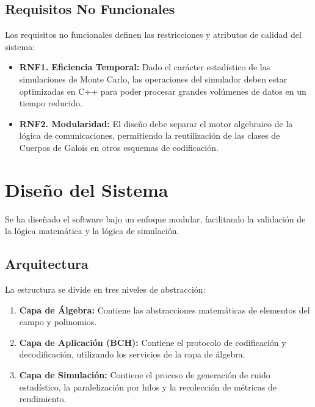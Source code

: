 \subsection{Requisitos No Funcionales}
Los requisitos no funcionales definen las restricciones y atributos de calidad del sistema:
\begin{itemize}
    \item \textbf{RNF1. Eficiencia Temporal:} Dado el carácter estadístico de las simulaciones de Monte Carlo, las operaciones del simulador deben estar optimizadas en C++ para poder procesar grandes volúmenes de datos en un tiempo reducido.
    
    \item \textbf{RNF2. Modularidad:} El diseño debe separar el motor algebraico de la lógica de comunicaciones, permitiendo la reutilización de las clases de Cuerpos de Galois en otros esquemas de codificación. 
    
\end{itemize}
    
\section{Diseño del Sistema}
Se ha diseñado el software bajo un enfoque modular, facilitando la validación de la lógica matemática y la lógica de simulación.
\subsection{Arquitectura}
La estructura se divide en tres niveles de abstracción:

\begin{enumerate}

    \item \textbf{Capa de Álgebra:} Contiene las abstracciones matemáticas de elementos del campo y polinomios. 
    
    \item \textbf{Capa de Aplicación (BCH):} Contiene el protocolo de codificación y decodificación, utilizando los servicios de la capa de álgebra.
    
    \item \textbf{Capa de Simulación:} Contiene el proceso de generación de ruido estadístico, la paralelización por hilos y la recolección de métricas de rendimiento.
    
\end{enumerate}

